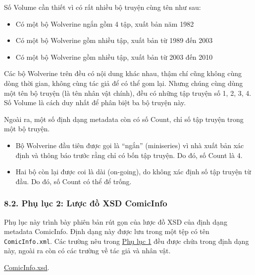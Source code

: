 \documentclass[
]{article}
\providecommand{\tightlist}{%
  \setlength{\itemsep}{0pt}\setlength{\parskip}{0pt}}
\begin{document}
Số Volume cần thiết vì có rất nhiều bộ truyện cùng tên như sau:

\begin{itemize}
\tightlist
\item
  Có một bộ Wolverine ngắn gồm 4 tập, xuất bản năm 1982
\item
  Có một bộ Wolverine gồm nhiều tập, xuất bản từ 1989 đến 2003
\item
  Có một bộ Wolverine gồm nhiều tập, xuất bản từ 2003 đến 2010
\end{itemize}

Các bộ Wolverine trên đều có nội dung khác nhau, thậm chí cũng không
cùng dòng thời gian, không cùng tác giả để có thể gom lại. Nhưng chúng
cùng dùng một tên bộ truyện (là tên nhân vật chính), đều có những tập
truyện số 1, 2, 3, 4. Số Volume là cách duy nhất để phân biệt ba bộ
truyện này.

Ngoài ra, một số định dạng metadata còn có số Count, chỉ số tập truyện
trong một bộ truyện.

\begin{itemize}
\tightlist
\item
  Bộ Wolverine đầu tiên được gọi là ``ngắn'' (miniseries) vì nhà xuất
  bản xác định và thông báo trước rằng chỉ có bốn tập truyện. Do đó, số
  Count là 4.
\item
  Hai bộ còn lại được coi là dài (on-going), do không xác định số tập
  truyện từ đầu. Do đó, số Count có thể để trống.
\end{itemize}

\hypertarget{phux1ee5-lux1ee5c-2-lux1b0ux1ee3c-ux111ux1ed3-xsd-comicinfo}{%
\subsubsection{\texorpdfstring{8.2. Phụ lục 2: Lược đồ XSD ComicInfo
}{8.2. Phụ lục 2: Lược đồ XSD ComicInfo }}\label{phux1ee5-lux1ee5c-2-lux1b0ux1ee3c-ux111ux1ed3-xsd-comicinfo}}

Phụ lục này trình bày phiên bản rút gọn của lược đồ XSD của định dạng
metadata ComicInfo. Định dạng này được lưu trong một tệp có tên
\texttt{ComicInfo.xml}. Các trường nêu trong
\protect\hyperlink{P9.1-metadata}{Phụ lục 1} đều được chứa trong định
dạng này, ngoài ra còn có các trường về tác giả và nhân vật.

\href{../assets/ComicInfo.xsd}{ComicInfo.xsd}.
\end{document}
